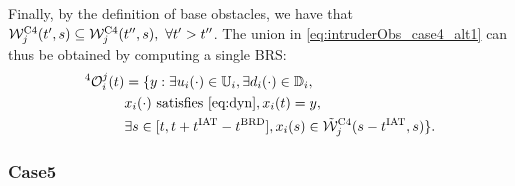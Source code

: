 Finally, by the definition of base obstacles, we have that $\mathcal{W}_j^{\text{C4}}(t', s) \subseteq \mathcal{W}_j^{\text{C4}}(t'', s), ~\forall t' > t''$. The union in \eqref{eq:intruderObs_case4_alt1} can thus be obtained by computing a single BRS:
\begin{equation} \label{eq:intruderObs_case4} 
\begin{aligned}
^4\ioset_i^j(t) & = \{y: \exists \ctrl_i(\cdot) \in \cfset_i, \exists \dstb_i(\cdot) \in \dfset_i, \\
& \state_i(\cdot) \text{ satisfies \eqref{eq:dyn}}, \state_i(t) = y, \\
& \exists s \in [t, t + \iat - \brd], \state_i(s) \in \tilde{\frs}_j^{\text{C4}}(s-\iat, s)\}.
\end{aligned}
\end{equation}

\subsubsection{Case5} \label{sec:intruderObs_case5}


